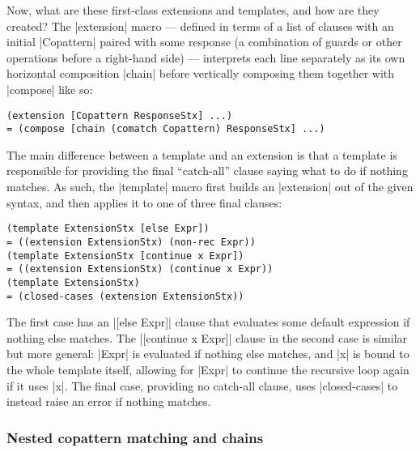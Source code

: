 Now, what are these first-class extensions and templates, and how are they created?
The \scm|extension| macro --- defined in terms of a list of clauses with an initial \scm|Copattern| paired with some response (a combination of guards or other operations before a right-hand side) --- interprets each line separately as its own horizontal composition \scm|chain| before vertically composing them together with \scm|compose| like so:
\begin{verbatim}
(extension [Copattern ResponseStx] ...)
= (compose [chain (comatch Copattern) ResponseStx] ...)
\end{verbatim}
The main difference between a template and an extension is that a template is responsible for providing the final ``catch-all'' clause saying what to do if nothing matches.
As such, the \scm|template| macro first builds an \scm|extension| out of the given syntax, and then applies it to one of three final clauses:
\begin{verbatim}
(template ExtensionStx [else Expr])
= ((extension ExtensionStx) (non-rec Expr))
(template ExtensionStx [continue x Expr])
= ((extension ExtensionStx) (continue x Expr))
(template ExtensionStx)
= (closed-cases (extension ExtensionStx))
\end{verbatim}
The first case has an \scm|[else Expr]| clause that evaluates some default expression if nothing else matches.
The \scm|[continue x Expr]| clause in the second case is similar but more general:
\scm|Expr| is evaluated if nothing else matches, and \scm|x| is bound to the whole template itself, allowing for \scm|Expr| to continue the recursive loop again if it uses \scm|x|.
The final case, providing no catch-all clause, uses \scm|closed-cases| to instead raise an error if nothing matches.

\subsubsection{Nested copattern matching and chains}

